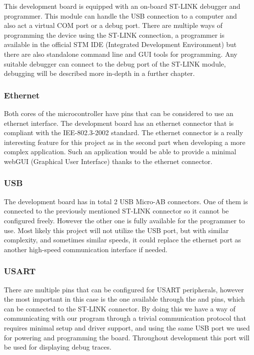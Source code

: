 This development board is equipped with an on-board ST-LINK debugger and programmer. This module can handle the USB connection to a computer and also act a virtual COM port or a debug port. There are multiple ways of programming the device using the ST-LINK connection, a programmer is available in the official STM IDE (Integrated Development Environment) but there are also standalone command line and GUI tools for programming. Any suitable debugger can connect to the debug port of the ST-LINK module, debugging will be described more in-depth in a further chapter.

\subsubsection{Ethernet}

Both cores of the microcontroller have pins that can be considered to use an ethernet interface. The development board has an ethernet connector that is compliant with the IEE-802.3-2002 standard. The ethernet connector is a really interesting feature for this project as in the second part when developing a more complex application. Such an application would be able to provide a minimal webGUI (Graphical User Interface) thanks to the ethernet connector.

\subsubsection{USB}

The development board has in total 2 USB Micro-AB connectors. One of them is connected to the previously mentioned ST-LINK connector so it cannot be configured freely. However the other one is fully available for the programmer to use. Most likely this project will not utilize the USB port, but with similar complexity, and sometimes similar speeds, it could replace the ethernet port as another high-speed communication interface if needed.

\subsubsection{USART}

There are multiple pins that can be configured for USART peripherals, however the most important in this case is the one available through the  and  pins, which can be connected to the ST-LINK connector. By doing this we have a way of communicating with our program through a trivial communication protocol that requires minimal setup and driver support, and using the same USB port we used for powering and programming the board. Throughout development this port will be used for displaying debug traces.

